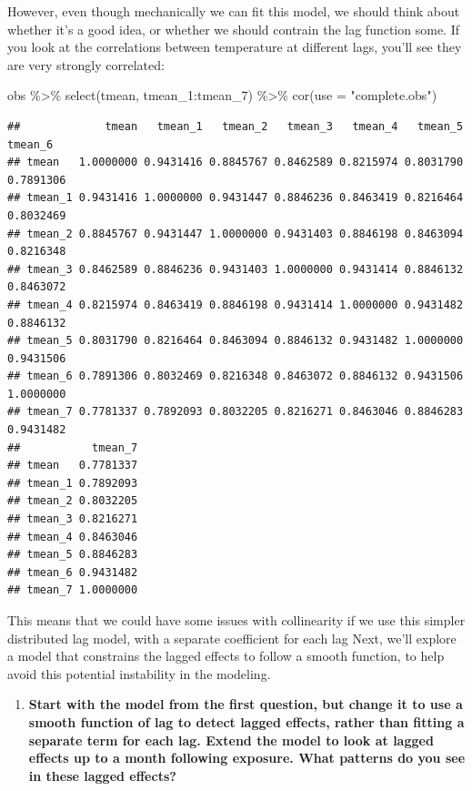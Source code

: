 \documentclass[
]{book}
\newenvironment{Shaded}{\begin{snugshade}}{\end{snugshade}}
\newcommand{\AttributeTok}[1]{\textcolor[rgb]{0.77,0.63,0.00}{#1}}
\newcommand{\FunctionTok}[1]{\textcolor[rgb]{0.00,0.00,0.00}{#1}}
\newcommand{\NormalTok}[1]{#1}
\newcommand{\SpecialCharTok}[1]{\textcolor[rgb]{0.00,0.00,0.00}{#1}}
\newcommand{\StringTok}[1]{\textcolor[rgb]{0.31,0.60,0.02}{#1}}
\providecommand{\tightlist}{%
  \setlength{\itemsep}{0pt}\setlength{\parskip}{0pt}}
\begin{document}
However, even though mechanically we can fit this model, we should think about whether
it's a good idea, or whether we should contrain the lag function some.
If you look at the correlations between temperature at different lags, you'll see they are very
strongly correlated:

\begin{Shaded}
\begin{Highlighting}[]
\NormalTok{obs }\SpecialCharTok{\%\textgreater{}\%} 
  \FunctionTok{select}\NormalTok{(tmean, tmean\_1}\SpecialCharTok{:}\NormalTok{tmean\_7) }\SpecialCharTok{\%\textgreater{}\%} 
  \FunctionTok{cor}\NormalTok{(}\AttributeTok{use =} \StringTok{"complete.obs"}\NormalTok{) }
\end{Highlighting}
\end{Shaded}

\begin{verbatim}
##             tmean   tmean_1   tmean_2   tmean_3   tmean_4   tmean_5   tmean_6
## tmean   1.0000000 0.9431416 0.8845767 0.8462589 0.8215974 0.8031790 0.7891306
## tmean_1 0.9431416 1.0000000 0.9431447 0.8846236 0.8463419 0.8216464 0.8032469
## tmean_2 0.8845767 0.9431447 1.0000000 0.9431403 0.8846198 0.8463094 0.8216348
## tmean_3 0.8462589 0.8846236 0.9431403 1.0000000 0.9431414 0.8846132 0.8463072
## tmean_4 0.8215974 0.8463419 0.8846198 0.9431414 1.0000000 0.9431482 0.8846132
## tmean_5 0.8031790 0.8216464 0.8463094 0.8846132 0.9431482 1.0000000 0.9431506
## tmean_6 0.7891306 0.8032469 0.8216348 0.8463072 0.8846132 0.9431506 1.0000000
## tmean_7 0.7781337 0.7892093 0.8032205 0.8216271 0.8463046 0.8846283 0.9431482
##           tmean_7
## tmean   0.7781337
## tmean_1 0.7892093
## tmean_2 0.8032205
## tmean_3 0.8216271
## tmean_4 0.8463046
## tmean_5 0.8846283
## tmean_6 0.9431482
## tmean_7 1.0000000
\end{verbatim}

This means that we could have some issues with collinearity if we
use this simpler distributed lag model, with a separate coefficient for each lag
Next, we'll explore a model that constrains the lagged effects to follow a smooth
function, to help avoid this potential instability in the modeling.

\begin{enumerate}
\def\labelenumi{\arabic{enumi}.}
\setcounter{enumi}{1}
\tightlist
\item
  \textbf{Start with the model from the first question, but change it to use a smooth
  function of lag to detect lagged effects, rather than fitting a separate term
  for each lag. Extend the model to look at lagged effects up to a month following
  exposure. What patterns do you see in these lagged effects?}
\end{enumerate}
\end{document}
